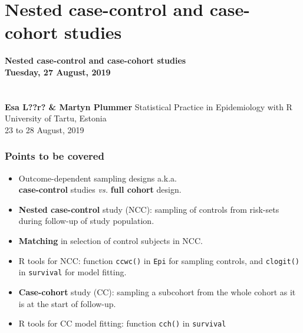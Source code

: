 \documentclass[12pt,dvipsnames,t,handout%
,aspectratio=169%
]{beamer}
\newcommand{\currentlecture}{}
\newcommand{\banner}[3]{
\addtocounter{framenumber}{-0}
\section{#1}
\renewcommand{\currentlecture}{#1}
\begin{frame}[plain]
{\usebeamercolor[fg]{frametitle}
 \LARGE \bf #1\\
 \large \sf #2\\
 \large \bf #3}
\vfill
Statistical Practice in Epidemiology with R\\
University of Tartu, Estonia\\
23 to 28 August, 2019\\
\end{frame}
%
}
\begin{document}



 \banner{Nested case-control and case-cohort studies}%
       {Tuesday, 27 August, 2019  \\{ } }%
        { { } \\ Esa L??r? \& Martyn Plummer }

\begin{frame}
\frametitle{Points to be covered}

\begin{itemize}
\item
Outcome-dependent sampling designs a.k.a. \\ 
\textbf{case-control} studies {\it vs.} 
\textbf{full cohort} design.
\medskip
\item
\textbf{Nested case-control} study (NCC): sampling 
of controls from risk-sets during follow-up of study population.
\medskip
\item
\textbf{Matching} in selection of control subjects in NCC.
\medskip
\item
R tools for NCC: function {\tt ccwc()}  in {\tt Epi} 
for sampling controls, and
 {\tt clogit()} in {\tt survival} 
 for model fitting.
\medskip
\item
\textbf{Case-cohort} study (CC): sampling a subcohort from the
whole cohort as it is at the start of follow-up.
\medskip
\item
R tools for CC model fitting: function {\tt cch()} in \texttt{survival}
\end{itemize}
\end{frame}
\end{document}
